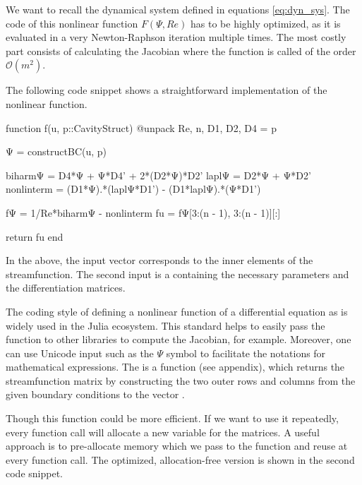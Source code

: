 We want to recall the dynamical system defined in equations \eqref{eq:dyn_sys}.
The code of this nonlinear function $F(\Psi, Re)$ has to be highly optimized,
as it is evaluated in a very Newton-Raphson iteration multiple times. The most
costly part consists of calculating the Jacobian where the function is called
of the order $\mathcal{O}(m^2)$.

The following code snippet shows a straightforward implementation of the
nonlinear function. 

\begin{jllisting}[caption=Simple implementation in Julia of the nonlinear
  function $F$ \vspace{4pt},float]
function f(u, p::CavityStruct)
    @unpack Re, n, D1, D2, D4 = p

    Ψ = constructBC(u, p)

    biharmΨ = D4*Ψ +  Ψ*D4' + 2*(D2*Ψ)*D2'
    laplΨ = D2*Ψ + Ψ*D2'
    nonlinterm = (D1*Ψ).*(laplΨ*D1') - (D1*laplΨ).*(Ψ*D1')
    
    fΨ = 1/Re*biharmΨ - nonlinterm
    fu = fΨ[3:(n - 1), 3:(n - 1)][:]

    return fu 
end
\end{jllisting}

In the above, the input vector  corresponds to the inner elements of
the streamfunction. The second input  is a  containing
the necessary parameters and the differentiation matrices. 

The coding style of defining a nonlinear function of a differential equation as
 is widely used in the Julia ecosystem. This standard helps to
easily pass the function to other libraries to compute the Jacobian, for
example. Moreover, one can use Unicode input such as the $\Psi $ symbol to
facilitate the notations for mathematical expressions. The
 is a function (see appendix), which returns the
streamfunction matrix by constructing the two outer rows and columns from the
given boundary conditions to the vector .

Though this function could be more efficient. If we want to use it repeatedly,
every function call will allocate a new variable for the matrices. A useful
approach is to pre-allocate memory which we pass to the function and reuse at
every function call. The optimized, allocation-free version is shown in the
second code snippet. 

